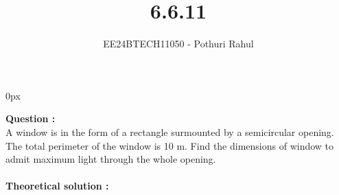 \documentclass[journal]{IEEEtran}
\begin{document}

\vspace{3cm}
\parindent 0px

\title{6.6.11}
\author{EE24BTECH11050 - Pothuri Rahul}
{\let\newpage\relax\maketitle}

\renewcommand{\thefigure}{\theenumi}
\renewcommand{\thetable}{\theenumi}
\setlength{\intextsep}{10pt} %


\renewcommand{\thetable}{\theenumi}

\textbf{Question :} \\ 
A window is in the form of a rectangle surmounted by a semicircular opening. The total perimeter of the window is 10 m. Find the dimensions of window to admit maximum light through the whole opening. \\
\solution \\
\textbf{Theoretical solution :} \\
\end{document}
